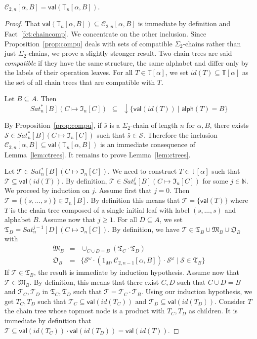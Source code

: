 \documentclass[envcountsame]{llncs}
\newcommand\nat{\ensuremath{\mathbb{N}}\xspace}
\newcommand\Cs{\ensuremath{\mathcal{C}}\xspace}
\newcommand\Cstwolen[1]{\ensuremath{\Cs_{2,#1}}\xspace}
\newcommand\Cstwon{\ensuremath{\Cstwolen{n}}\xspace}
\newcommand\Ss{\ensuremath{\mathcal{S}}\xspace}
\newcommand\Ts{\ensuremath{\mathcal{T}}\xspace}
\newcommand\ct{\ensuremath{\mathbb{T}}\xspace}
\newcommand{\sic}[1]{\ensuremath{\Sigma_{#1}}\xspace}
\let\geq\geqslant
\newcommand\content[1]{\ensuremath{\contentmorphism(#1)}}
\newcommand\contentmorphism{\ensuremath{\textsf{alph}}}
\newcommand\val[1]{\ensuremath{\textsf{val}(#1)\xspace}}
\newcommand\chain{chain\xspace}
\newcommand\qchain[1]{\ensuremath{\sic{#1}}-chain\xspace}
\newcommand\qchains[1]{\ensuremath{\sic{#1}}-chains\xspace}
\newcommand\dchain{\qchain{2}}
\newcommand\dchains{\qchains{2}}
\newcommand\fI{\ensuremath{\mathfrak I}\xspace}
\newcommand\fM{\ensuremath{\mathfrak M}\xspace}
\newcommand\fO{\ensuremath{\mathfrak O}\xspace}
\newcommand\fT{\ensuremath{\mathfrak T}\xspace}
\DeclareMathOperator{\downclos}{\downarrow}
\begin{document}
\begin{proposition} \label{prop:ctree}
  $\Cstwon[\alpha,B] = \val{\ct_n[\alpha,B]}$.
\end{proposition}

\begin{proof}
  That $\val{\ct_n[\alpha,B]} \subseteq \Cstwon[\alpha,B]$ is immediate
  by definition and Fact~\ref{fct:chaincomp}. We concentrate on the other
  inclusion. Since Proposition~\ref{prop:compu} deals with sets of
  compatible \dchains rather than just \dchains, we prove a slightly
  stronger result. Two \chain trees are said \emph{compatible} if they
  have the same structure, the same alphabet and differ only by the
  labels of their operation leaves. For all $T \in \ct[\alpha]$, we set
  $id(T) \subseteq \ct[\alpha]$  as the set of all \chain trees that are
  compatible with $T$.

  \begin{lemma} \label{lem:ctrees}
    Let $B \subseteq A$. Then $$Sat^*_n[B](C
    \mapsto \fI_n[C]) ~~\subseteq~~ \downclos \{\val{id(T)} \mid \content{T} = B\}$$
  \end{lemma}

  By Proposition~\ref{prop:compu}, if $\bar{s}$ is a \dchain of length
  $n$ for $\alpha,B$, there exists $\Ss \in Sat^*_n[B](C \mapsto
  \fI_n[C])$ such that $\bar{s} \in \Ss$. Therefore the inclusion
  $\Cstwon[\alpha,B] \subseteq \val{\ct_n[\alpha,B]}$ is an immediate
  consequence of Lemma~\ref{lem:ctrees}. It remains to prove
  Lemma~\ref{lem:ctrees}.

  Let $\Ts \in Sat^*_n[B](C \mapsto \fI_n[C])$. We
  need to construct $T \in \ct[\alpha]$ such that $\Ts \subseteq
  \val{id(T)}$. By definition, $\Ts \in Sat^j_n[B](C \mapsto \fI_n[C])$
  for some $j \in \nat$. We proceed by induction on $j$. Assume first
  that $j=0$. Then $\Ts = \{(s,\dots,s)\} \in \fI_n[B]$. By definition
  this means that $\Ts = \{\val{T}\}$ where $T$ is the \chain tree
  composed of a single initial leaf with label $(s,\dots,s)$ and
  alphabet $B$. Assume now that $j \geq 1$. For all $D \subseteq A$, we
  set $\fT_D = Sat^{j-1}_n[D](C \mapsto \fI_n[C])$. By definition, we
  have $\Ts \in \fT_B \cup \fM_B \cup \fO_B$ with
  \begin{eqnarray*}
    \fM_B & = & \cup_{C \cup D = B} (\fT_C \cdot \fT_D) \\
    \fO_B & = & \{\Ss^\omega \cdot (1_M,\Cstwolen{n-1}[\alpha,B]) \cdot
    \Ss^{\omega} \mid \Ss \in \fT_B\}
  \end{eqnarray*}
  If $\Ts \in \fT_B$, the result is immediate by induction
  hypothesis. Assume now that $\Ts \in \fM_B$. By definition, this means
  that there exist $C,D$ such that $C \cup D = B$ and $\Ts_C,\Ts_D$ in
  $\fT_C,\fT_D$ such that $\Ts = \Ts_C \cdot \Ts_B$. Using our induction
  hypothesis, we get $T_C,T_D$ such that $\Ts_C \subseteq \val{id(T_C)}$
  and $\Ts_D \subseteq  \val{id(T_D)}$. Consider $T$ the \chain tree
  whose topmost node is a product with $T_C,T_D$ as children. It is
  immediate by definition that $\Ts \subseteq \val{id(T_C)} \cdot
  \val{id(T_D)} = \val{id(T)}$.


\end{proof}
\end{document}
